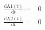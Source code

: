 \begin{align}
\frac{\mathrm{d} \mathrm{A1}\left( t \right)}{\mathrm{d}t} =& 0 \\
\frac{\mathrm{d} \mathrm{A2}\left( t \right)}{\mathrm{d}t} =& 0
\end{align}
